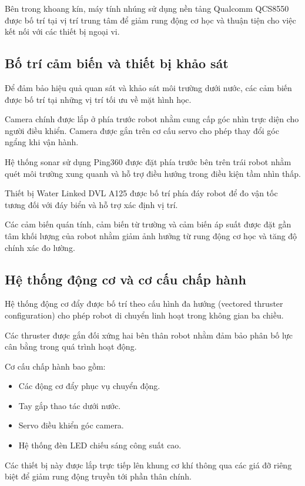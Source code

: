 \documentclass[../DoAn.tex]{subfiles}
\begin{document}
Bên trong khoang kín, máy tính nhúng sử dụng nền tảng 
Qualcomm QCS8550 
được bố trí tại vị trí trung tâm để giảm rung động cơ học và thuận tiện cho việc kết nối với các thiết bị ngoại vi.

\subsection{Bố trí cảm biến và thiết bị khảo sát}

Để đảm bảo hiệu quả quan sát và khảo sát môi trường dưới nước, các cảm biến được bố trí tại những vị trí tối ưu về mặt hình học.

Camera chính được lắp ở phía trước robot nhằm cung cấp góc nhìn trực diện cho người điều khiển. Camera được gắn trên cơ cấu servo cho phép thay đổi góc ngẩng khi vận hành.

Hệ thống sonar sử dụng 
Ping360 
được đặt phía trước bên trên trái robot nhằm quét môi trường xung quanh và hỗ trợ điều hướng trong điều kiện tầm nhìn thấp.

Thiết bị 
Water Linked DVL A125 
được bố trí phía đáy robot để đo vận tốc tương đối với đáy biển và hỗ trợ xác định vị trí.

Các cảm biến quán tính, cảm biến từ trường và cảm biến áp suất được đặt gần tâm khối lượng của robot nhằm giảm ảnh hưởng từ rung động cơ học và tăng độ chính xác đo lường.

\subsection{Hệ thống động cơ và cơ cấu chấp hành}

Hệ thống động cơ đẩy được bố trí theo cấu hình đa hướng (vectored thruster configuration) cho phép robot di chuyển linh hoạt trong không gian ba chiều.

Các thruster được gắn đối xứng hai bên thân robot nhằm đảm bảo phân bố lực cân bằng trong quá trình hoạt động.

Cơ cấu chấp hành bao gồm:

\begin{itemize}
    \item Các động cơ đẩy phục vụ chuyển động.
    \item Tay gắp thao tác dưới nước.
    \item Servo điều khiển góc camera.
    \item Hệ thống đèn LED chiếu sáng công suất cao.
\end{itemize}

Các thiết bị này được lắp trực tiếp lên khung cơ khí thông qua các giá đỡ riêng biệt để giảm rung động truyền tới phần thân chính.
\end{document}
